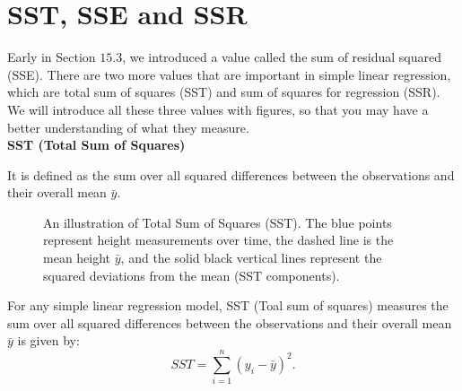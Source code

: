 \section{SST, SSE and SSR}

Early in Section $15.3$, we introduced a value called the sum of residual squared (SSE). There are two more values that are important in simple linear regression, which are total sum of squares (SST) and sum of squares for regression (SSR). We will introduce all these three values with figures, so that you may have a better understanding of what they measure.\\

\textbf{SST (Total Sum of Squares)}

It is defined as the sum over all squared differences between the observations and their overall mean $\bar{y}$.

\begin{figure}[h]
\begin{center}
\end{center}
\caption{An illustration of Total Sum of Squares (SST). The blue points represent height measurements over time, the dashed line is the mean height $\bar{y}$, and the solid black vertical lines represent the squared deviations from the mean (SST components).}
\end{figure}

\begin{definition}
For any simple linear regression model, SST (Toal sum of squares) measures the sum over all squared differences between the observations and their overall mean $\bar{y}$ is given by: \[ SST = \sum_{i=1}^{n}(y_i - \bar{y})^2.\]
\end{definition}

